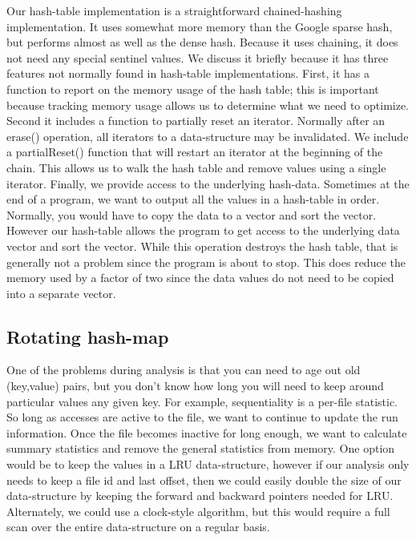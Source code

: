Our hash-table implementation is a straightforward chained-hashing
implementation.  It uses somewhat more memory than the Google sparse
hash, but performs almost as well as the dense hash.  Because it uses
chaining, it does not need any special sentinel values.  We discuss it
briefly because it has three features not normally found in hash-table
implementations.  First, it has a function to report on the memory
usage of the hash table; this is important because tracking memory
usage allows us to determine what we need to optimize.  Second it
includes a function to partially reset an iterator.  Normally after an
erase() operation, all iterators to a data-structure may be
invalidated.  We include a partialReset() function that will restart
an iterator at the beginning of the chain.  This allows us to walk the
hash table and remove values using a single iterator.  Finally, we
provide access to the underlying hash-data.  Sometimes at the end of a
program, we want to output all the values in a hash-table in order.
Normally, you would have to copy the data to a vector and sort the
vector.  However our hash-table allows the program to get access to
the underlying data vector and sort the vector.  While this operation
destroys the hash table, that is generally not a problem since the
program is about to stop.  This does reduce the memory used by a
factor of two since the data values do not need to be copied into a
separate vector.

\subsection{Rotating hash-map}

One of the problems during analysis is that you can need to age out
old (key,value) pairs, but you don't know how long you will need to
keep around particular values any given key.  For example,
sequentiality is a per-file statistic.  So long as accesses are active
to the file, we want to continue to update the run information.  Once
the file becomes inactive for long enough, we want to calculate
summary statistics and remove the general statistics from memory.  One
option would be to keep the values in a LRU data-structure, however if
our analysis only needs to keep a file id and last offset, then we
could easily double the size of our data-structure by keeping the
forward and backward pointers needed for LRU.  Alternately, we could
use a clock-style algorithm, but this would require a full scan over
the entire data-structure on a regular basis.

